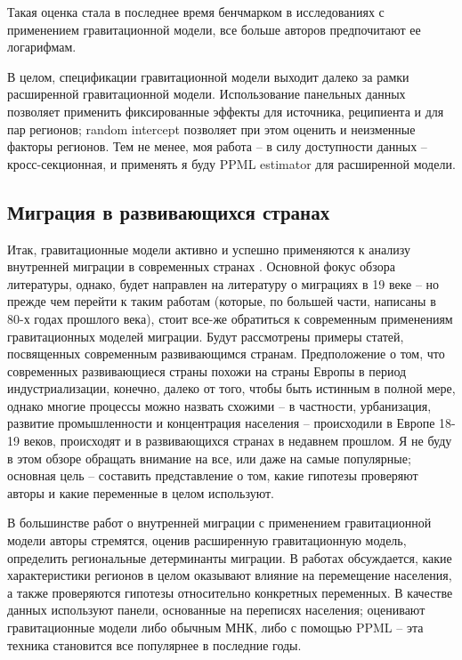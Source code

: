 \documentclass[a4paper,12pt]{article}
\begin{document}

Такая оценка стала в последнее время бенчмарком в исследованиях с применением гравитационной модели, все больше авторов предпочитают ее логарифмам.

В целом, спецификации гравитационной модели выходит далеко за рамки расширенной гравитационной модели. Использование панельных данных позволяет применить фиксированные эффекты для источника, реципиента и для пар регионов; random intercept позволяет при этом оценить и неизменные факторы регионов. Тем не менее, моя работа -- в силу доступности данных -- кросс-секционная, и применять я буду PPML estimator для расширенной модели.


\subsection{Миграция в развивающихся странах}

Итак, гравитационные модели активно и успешно применяются к анализу внутренней миграции в современных странах \citep{andrienko_determinants_2004, guriev_breaking_2015, molloy_internal_2011, etzo_internal_2008}.
Основной фокус обзора литературы, однако, будет направлен на литературу о миграциях в 19 веке -- но прежде чем перейти к таким работам (которые, по большей части, написаны в 80-х годах прошлого века), стоит все-же обратиться к современным применениям гравитационных моделей миграции. Будут рассмотрены примеры статей, посвященных современным развивающимся странам. 
Предположение о том, что современных развивающиеся страны похожи на страны Европы в период индустриализации, конечно, далеко от того, чтобы быть истинным в полной мере, однако многие процессы можно назвать схожими -- в частности, урбанизация, развитие промышленности и концентрация населения -- происходили в Европе 18-19 веков, происходят и в развивающихся странах в недавнем прошлом. 
Я не буду в этом обзоре обращать внимание на все, или даже на самые популярные; основная цель – составить представление о том, какие гипотезы проверяют авторы и какие переменные в целом используют.

В большинстве работ о внутренней миграции с применением гравитационной модели авторы стремятся, оценив расширенную гравитационную модель, определить региональные детерминанты миграции. В работах обсуждается, какие характеристики регионов в целом оказывают влияние на перемещение населения, а также проверяются гипотезы относительно конкретных переменных. В качестве данных используют панели, основанные на переписях населения; оценивают гравитационные модели либо обычным МНК, либо с помощью PPML -- эта техника становится все популярнее в последние годы.
\end{document}
